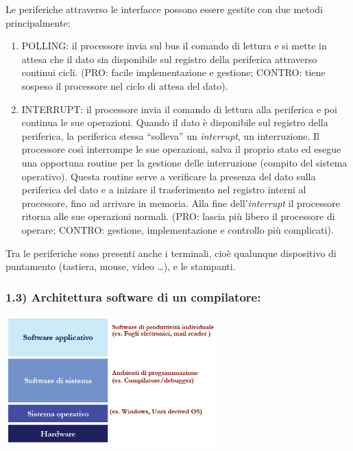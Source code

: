\documentclass[
  paper=a4,
  oneside  ,captions=tableheading
]{scrbook}
\providecommand{\tightlist}{%
  \setlength{\itemsep}{0pt}\setlength{\parskip}{0pt}}
\begin{document}
Le periferiche attraverso le interfacce possono essere gestite con due
metodi principalmente:

\begin{enumerate}
\def\labelenumi{\arabic{enumi}.}
\tightlist
\item
  POLLING: il processore invia sul bus il comando di lettura e si mette
  in attesa che il dato sia disponibile sul registro della periferica
  attraverso continui cicli. (PRO: facile implementazione e gestione;
  CONTRO: tiene sospeso il processore nel ciclo di attesa del dato).
\item
  INTERRUPT: il processore invia il comando di lettura alla periferica e
  poi continua le sue operazioni. Quando il dato è disponibile sul
  registro della periferica, la periferica stessa ``solleva'' un
  \emph{interrupt}, un interruzione. Il processore così interrompe le
  sue operazioni, salva il proprio stato ed esegue una opportuna routine
  per la gestione delle interruzione (compito del sistema operativo).
  Questa routine serve a verificare la presenza del dato sulla
  periferica del dato e a iniziare il trasferimento nel registro interni
  al processore, fino ad arrivare in memoria. Alla fine
  dell'\emph{interrupt} il processore ritorna alle sue operazioni
  normali. (PRO: lascia più libero il processore di operare; CONTRO:
  gestione, implementazione e controllo più complicati).
\end{enumerate}

Tra le periferiche sono presenti anche i terminali, cioè qualunque
dispositivo di puntamento (tastiera, mouse, video \ldots), e le
stampanti.

\hypertarget{architettura-software-di-un-compilatore}{%
\subsubsection{1.3) Architettura software di un
compilatore:}\label{architettura-software-di-un-compilatore}}

\includegraphics[height=5cm]{./image/image-20201112231919938.png}
\end{document}
